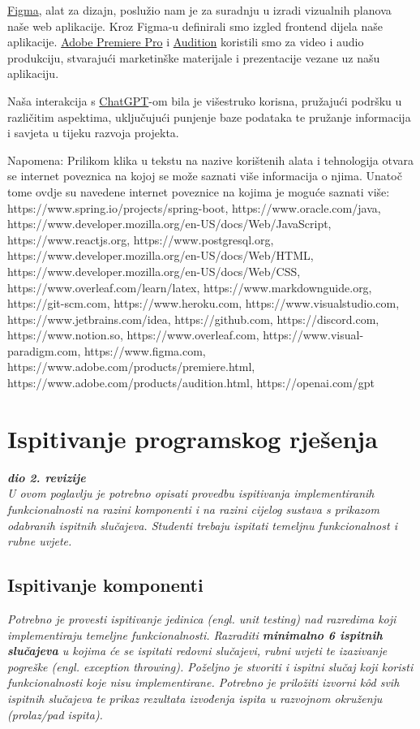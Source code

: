 \href{https://www.figma.com}{Figma}, alat za dizajn, poslužio nam je za suradnju u izradi vizualnih planova naše web aplikacije. Kroz Figma-u definirali smo izgled frontend dijela naše aplikacije. \href{https://www.adobe.com/products/premiere.html}{Adobe Premiere Pro} i \href{https://www.adobe.com/products/audition.html}{Audition} koristili smo za video i audio produkciju, stvarajući marketinške materijale i prezentacije vezane uz našu aplikaciju.

Naša interakcija s \href{https://openai.com/gpt}{ChatGPT}-om bila je višestruko korisna, pružajući podršku u različitim aspektima, uključujući punjenje baze podataka te pružanje informacija i savjeta u tijeku razvoja projekta. 


 		Napomena: Prilikom klika u tekstu na nazive korištenih alata i tehnologija otvara se internet poveznica na kojoj se može saznati više informacija o njima. Unatoč tome ovdje su navedene internet poveznice na kojima je moguće saznati više:  https://www.spring.io/projects/spring-boot, https://www.oracle.com/java,  https://www.developer.mozilla.org/en-US/docs/Web/JavaScript, https://www.reactjs.org, https://www.postgresql.org, https://www.developer.mozilla.org/en-US/docs/Web/HTML, https://www.developer.mozilla.org/en-US/docs/Web/CSS, https://www.overleaf.com/learn/latex,  https://www.markdownguide.org, https://git-scm.com, https://www.heroku.com, https://www.visualstudio.com, https://www.jetbrains.com/idea, https://github.com, https://discord.com, https://www.notion.so, https://www.overleaf.com, https://www.visual-paradigm.com, https://www.figma.com, https://www.adobe.com/products/premiere.html, https://www.adobe.com/products/audition.html, https://openai.com/gpt
			\eject 
		
	
		\section{Ispitivanje programskog rješenja}
			
			\textbf{\textit{dio 2. revizije}}\\
			
			 \textit{U ovom poglavlju je potrebno opisati provedbu ispitivanja implementiranih funkcionalnosti na razini komponenti i na razini cijelog sustava s prikazom odabranih ispitnih slučajeva. Studenti trebaju ispitati temeljnu funkcionalnost i rubne uvjete.}
	
			
			\subsection{Ispitivanje komponenti}
			\textit{Potrebno je provesti ispitivanje jedinica (engl. unit testing) nad razredima koji implementiraju temeljne funkcionalnosti. Razraditi \textbf{minimalno 6 ispitnih slučajeva} u kojima će se ispitati redovni slučajevi, rubni uvjeti te izazivanje pogreške (engl. exception throwing). Poželjno je stvoriti i ispitni slučaj koji koristi funkcionalnosti koje nisu implementirane. Potrebno je priložiti izvorni kôd svih ispitnih slučajeva te prikaz rezultata izvođenja ispita u razvojnom okruženju (prolaz/pad ispita). }
			
